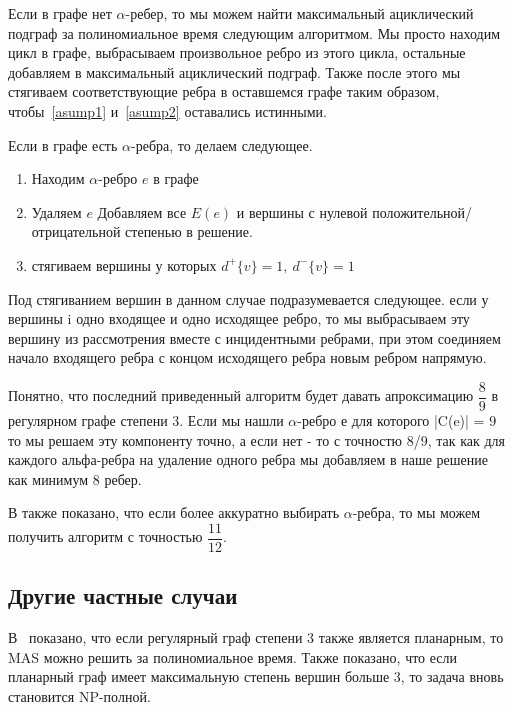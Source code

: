 Если в графе нет $\alpha$-ребер, то мы можем найти максимальный ациклический 
подграф за полиномиальное время следующим алгоритмом. Мы просто находим цикл
в графе, выбрасываем произвольное ребро из этого цикла, остальные добавляем в 
максимальный ациклический подграф. Также после этого мы стягиваем 
соответствующие ребра в оставшемся графе таким образом, чтобы~\ref{asump1}
 и~\ref{asump2} оставались истинными.

Если в графе есть $\alpha$-ребра, то делаем следующее.

\begin{enumerate}
    \item Находим $\alpha$-ребро $e$ в графе
    \item Удаляем $e$ Добавляем все $E(e)$ и вершины с нулевой 
        положительной/отрицательной степенью в решение.
    \item стягиваем вершины у которых $d^+\{v\}=1,~d^-\{v\}=1$
\end{enumerate}

Под стягиванием вершин в данном случае подразумевается следующее. если у 
вершины i одно входящее и одно исходящее ребро, то мы выбрасываем эту вершину 
из рассмотрения вместе с инцидентными ребрами, при этом соединяем начало 
входящего ребра с концом исходящего ребра новым ребром напрямую.

Понятно, что последний приведенный алгоритм будет давать апроксимацию 
$\dfrac{8}{9}$ в регулярном графе степени 3. Если мы нашли $\alpha$-ребро е для
которого |C(e)| = 9 то мы решаем эту компоненту точно, а если нет - то с 
точностю 8/9, так как для каждого альфа-ребра на удаление одного ребра мы
добавляем в наше решение как минимум 8 ребер.

В \cite{digraph_3} также показано, что если более аккуратно выбирать 
$\alpha$-ребра, то мы можем получить алгоритм с точностью $\dfrac{11}{12}$.

\subsection{Другие частные случаи}

В~\cite{planar} показано, что если регулярный граф степени 3 также является 
планарным, то MAS можно решить за полиномиальное время. Также показано, что
если планарный граф имеет максимальную степень вершин больше 3, то задача вновь
становится NP-полной.

